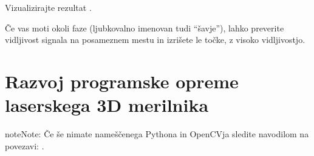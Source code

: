 \documentclass[letterpaper,10pt,english]{sphinxmanual}
\begin{document}
\sphinxAtStartPar
Vizualizirajte rezultat .

\begin{sphinxVerbatim}[commandchars=\\\{\},numbers=left,firstnumber=1,stepnumber=1]



\end{sphinxVerbatim}

\sphinxAtStartPar
Če vas moti  okoli faze (ljubkovalno imenovan tudi “šavje”), lahko preverite vidljivost signala na posameznem mestu in izrišete le točke, z visoko vidljivostjo.

\begin{sphinxVerbatim}[commandchars=\\\{\},numbers=left,firstnumber=1,stepnumber=1]

  
  



 
\end{sphinxVerbatim}


\chapter{Razvoj programske opreme laserskega 3D merilnika}
\label{\detokenize{laserskiprofilomer:razvoj-programske-opreme-laserskega-3d-merilnika}}\label{\detokenize{laserskiprofilomer:laserskiprofilomer}}\label{\detokenize{laserskiprofilomer::doc}}
\begin{sphinxadmonition}{note}{Note:}
\sphinxAtStartPar
Če še nimate nameščenega Pythona in OpenCVja sledite navodilom na povezavi: .
\end{sphinxadmonition}
\end{document}
